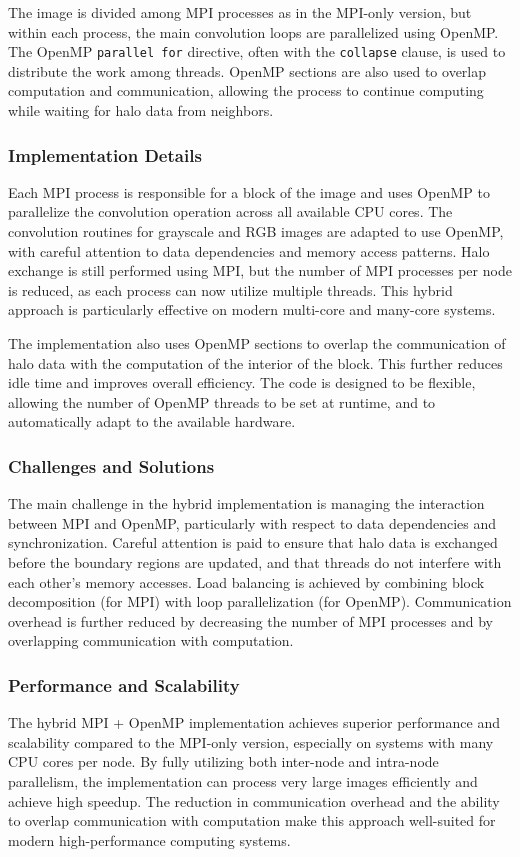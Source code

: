 \documentclass[conference, 10pt]{IEEEtran}
\begin{document}
The image is divided among MPI processes as in the MPI-only version, but within each process, the main convolution loops are parallelized using OpenMP. The OpenMP \texttt{parallel for} directive, often with the \texttt{collapse} clause, is used to distribute the work among threads. OpenMP sections are also used to overlap computation and communication, allowing the process to continue computing while waiting for halo data from neighbors.

\subsubsection{Implementation Details}
Each MPI process is responsible for a block of the image and uses OpenMP to parallelize the convolution operation across all available CPU cores. The convolution routines for grayscale and RGB images are adapted to use OpenMP, with careful attention to data dependencies and memory access patterns. Halo exchange is still performed using MPI, but the number of MPI processes per node is reduced, as each process can now utilize multiple threads. This hybrid approach is particularly effective on modern multi-core and many-core systems.

The implementation also uses OpenMP sections to overlap the communication of halo data with the computation of the interior of the block. This further reduces idle time and improves overall efficiency. The code is designed to be flexible, allowing the number of OpenMP threads to be set at runtime, and to automatically adapt to the available hardware.

\subsubsection{Challenges and Solutions}
The main challenge in the hybrid implementation is managing the interaction between MPI and OpenMP, particularly with respect to data dependencies and synchronization. Careful attention is paid to ensure that halo data is exchanged before the boundary regions are updated, and that threads do not interfere with each other's memory accesses. Load balancing is achieved by combining block decomposition (for MPI) with loop parallelization (for OpenMP). Communication overhead is further reduced by decreasing the number of MPI processes and by overlapping communication with computation.

\subsubsection{Performance and Scalability}
The hybrid MPI + OpenMP implementation achieves superior performance and scalability compared to the MPI-only version, especially on systems with many CPU cores per node. By fully utilizing both inter-node and intra-node parallelism, the implementation can process very large images efficiently and achieve high speedup. The reduction in communication overhead and the ability to overlap communication with computation make this approach well-suited for modern high-performance computing systems.
\end{document}
